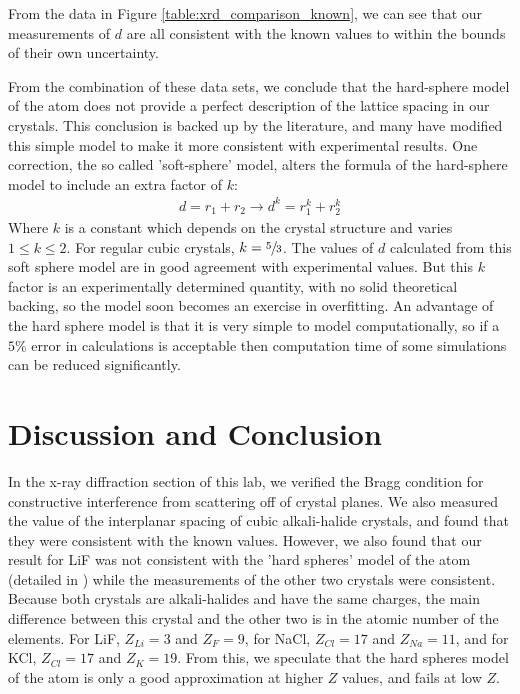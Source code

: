 \documentclass[%
 reprint,
 amsmath,amssymb,
 aps,
 pra,
]{revtex4-1}
\begin{document}
From the data in Figure \ref{table:xrd_comparison_known}, we can see that our measurements of $d$ are all consistent with the known values to within the bounds of their own uncertainty. 

From the combination of these data sets, we conclude that the hard-sphere model of the atom does not provide a perfect description of the lattice spacing in our crystals. This conclusion is backed up by the literature, and many have modified this simple model to make it more consistent with experimental results. One correction, the so called 'soft-sphere' model\cite{soft_sphere}, alters the formula of the hard-sphere model to include an extra factor of $k$:
\begin{gather}
	d = r_1 + r_2 \rightarrow d^k = r_1^k + r_2^k \nonumber
\end{gather}
Where $k$ is a constant which depends on the crystal structure and varies $1 \le k \le 2$. For regular cubic crystals, $k = \sfrac{5}{3}$. The values of $d$ calculated from this soft sphere model are in good agreement with experimental values. But this $k$ factor is an experimentally determined quantity, with no solid theoretical backing, so the model soon becomes an exercise in overfitting. An advantage of the hard sphere model is that it is very simple to model computationally, so if a $5\%$ error in calculations is acceptable then computation time of some simulations can be reduced significantly. 

\section{Discussion and Conclusion}

In the x-ray diffraction section of this lab, we verified the Bragg condition for constructive interference from scattering off of crystal planes. We also measured the value of the interplanar spacing of cubic alkali-halide crystals, and found that they were consistent with the known values. However, we also found that our result for LiF was not consistent with the 'hard spheres' model of the atom (detailed in \cite{hard_sphere, hard_sphere2}) while the measurements of the other two crystals were consistent. Because both crystals are alkali-halides and have the same charges, the main difference between this crystal and the other two is in the atomic number of the elements. For LiF, $Z_{Li} = 3$ and $Z_{F} = 9$, for NaCl, $Z_{Cl} = 17$ and $Z_{Na} = 11$, and for KCl, $Z_{Cl} = 17$ and $Z_{K} = 19$. From this, we speculate that the hard spheres model of the atom is only a good approximation at higher $Z$ values, and fails at low $Z$.
\end{document}
